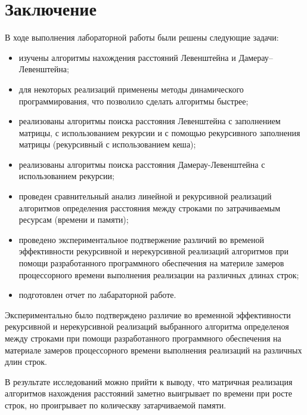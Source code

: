 \chapter*{Заключение}

В ходе выполнения лабораторной работы были решены следующие задачи:

\begin{itemize}
    \item изучены алгоритмы нахождения расстояний Левенштейна и Дамерау--Левенштейна;
	\item для некоторых реализаций применены методы динамического программирования, что позволило сделать алгоритмы быстрее;
	\item реализованы алгоритмы поиска расстояния Левенштейна с заполнением матрицы, с использованием рекурсии и с помощью рекурсивного заполнения матрицы (рекурсивный с использованием кеша);
	\item реализованы алгоритмы поиска расстояния Дамерау-Левенштейна с использованием рекурсии;
	\item проведен сравнительный анализ линейной и рекурсивной реализаций алгоритмов определения расстояния между строками по затрачиваемым ресурсам (времени и памяти);
	\item проведено экспериментальное подтвержение различий во временой эффективности рекурсивной и нерекурсивной реализаций алгоритмов при помощи разработанного программного обеспечения на материле замеров процессорного времени выполнения реализации на различных длинах строк;
	\item подготовлен отчет по лабараторной работе.
\end{itemize}

Экспериментально было подтверждено различие во временной эффективности рекурсивной и нерекурсивной реализаций выбранного алгоритма определеноя между строками при помощи разработанного программного обеспечения на материале замеров процессорного времени выполнения реализаций на различных длин строк.

В результате исследований можно прийти к выводу, что матричная реализация алгоритмов нахождения расстояний заметно выигрывает по времени при росте строк, но проигрывает по колическву затарчиваемой памяти.
